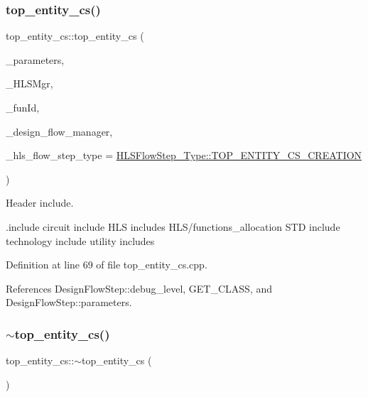 \subsubsection{\texorpdfstring{top\+\_\+entity\+\_\+cs()}{top\_entity\_cs()}}
{\footnotesize\ttfamily top\+\_\+entity\+\_\+cs\+::top\+\_\+entity\+\_\+cs (\begin{DoxyParamCaption}\item[{const \hyperlink{Parameter_8hpp_a37841774a6fcb479b597fdf8955eb4ea}{Parameter\+Const\+Ref}}]{\+\_\+parameters,  }\item[{const \hyperlink{hls__manager_8hpp_acd3842b8589fe52c08fc0b2fcc813bfe}{H\+L\+S\+\_\+manager\+Ref}}]{\+\_\+\+H\+L\+S\+Mgr,  }\item[{unsigned int}]{\+\_\+fun\+Id,  }\item[{const Design\+Flow\+Manager\+Const\+Ref}]{\+\_\+design\+\_\+flow\+\_\+manager,  }\item[{const \hyperlink{hls__step_8hpp_ada16bc22905016180e26fc7e39537f8d}{H\+L\+S\+Flow\+Step\+\_\+\+Type}}]{\+\_\+hls\+\_\+flow\+\_\+step\+\_\+type = {\ttfamily \hyperlink{hls__step_8hpp_ada16bc22905016180e26fc7e39537f8da243aeea128fd37ee739679d8c24dcfc3}{H\+L\+S\+Flow\+Step\+\_\+\+Type\+::\+T\+O\+P\+\_\+\+E\+N\+T\+I\+T\+Y\+\_\+\+C\+S\+\_\+\+C\+R\+E\+A\+T\+I\+ON}} }\end{DoxyParamCaption})}



Header include. 

.include circuit include H\+LS includes H\+L\+S/functions\+\_\+allocation S\+TD include technology include utility includes 

Definition at line 69 of file top\+\_\+entity\+\_\+cs.\+cpp.



References Design\+Flow\+Step\+::debug\+\_\+level, G\+E\+T\+\_\+\+C\+L\+A\+SS, and Design\+Flow\+Step\+::parameters.

\mbox{\label{classtop__entity__cs_ae132a928c3a5cf4cc1874bf410560d75}} 
\subsubsection{\texorpdfstring{$\sim$top\+\_\+entity\+\_\+cs()}{~top\_entity\_cs()}}
{\footnotesize\ttfamily top\+\_\+entity\+\_\+cs\+::$\sim$top\+\_\+entity\+\_\+cs (\begin{DoxyParamCaption}{ }\end{DoxyParamCaption})\hspace{0.3cm}{\ttfamily [virtual]}}



